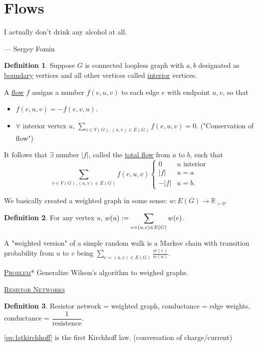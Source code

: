 \documentclass{report}
\newcommand{\R}{\mathbb{R}}
\newcommand{\defeq}{\vcentcolon=}
\newcommand{\fancyem}[1]{\underline{\textsc{#1}}}
\theoremstyle{definition}
\newtheorem{definition}{Definition}[section]
\theoremstyle{remark}
\numberwithin{equation}{section}
\begin{document}
\section{Flows}
\epigraph{I actually don't drink any alcohol at all.}{--- \textup{Sergey Fomin}}
\begin{definition}
    Suppose $G$ is connected loopless graph with $a, b$ designated as \underline{boundary} vertices and all other vertices called \underline{interior} vertices. 
    
    A \underline{flow} $f$ assigns a number $f(e, u, v)$ to each edge $e$ with endpoint $u, v$, so that \begin{itemize}
        \item $f(e, u, v) = -f(e, v, u)$.
        \item $\forall$ interior vertex $u$, $\displaystyle \sum_{v \in V(G), (u, v) \in E(G)} f(e, u, v) = 0$. ("Conservation of flow")
    \end{itemize}
\end{definition}
It follows that $\exists$ number $|f|$, called the \underline{total flow} from $a$ to $b$, such that \begin{equation}\label{eq:1stkirchhoff}
\sum_{v \in V(G), (u, v) \in E(G)} f(e, u, v)\begin{cases}
    0 & u \text{ interior} \\
    |f| &  u = a \\
    -|f| & u = b.
\end{cases}    
\end{equation}

We basically created a weighted graph in some sense: $w: E(G) \to \R_{>0}$. 
\begin{definition}
    For any vertex $u$, $\displaystyle w(u) \defeq \sum_{e = (u, v) \in E(G)} w(e)$.
\end{definition}

A "weighted version" of a simple random walk is a Markov chain with transition probability from $u$ to $v$ being $\displaystyle \sum_{e = (u, v) \in E(G)} \frac{w(e)}{w(u)}$.

\fancyem{Problem}* Generalize Wilson's algorithm to weighed graphs.

\fancyem{Resistor Networks}
\begin{definition}
    Resistor network = weighted graph, conductance = edge weights, conductance = $\dfrac{1}{\text{resistence}}$.
\end{definition}

\eqref{eq:1stkirchhoff} is the first Kirchhoff law. (conversation of charge/current)
\end{document}
